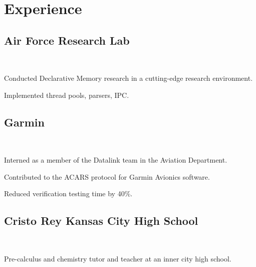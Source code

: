\documentclass[letterpaper]{deedy-resume} %
\begin{document}
\begin{minipage}[t]{0.66\textwidth}
\sectionspace %


\section{Experience}

\subsection{Air Force Research Lab}
 \hfill {} \\
\smallsectionspace
\vspace{\topsep} %
\begin{tightitemize}
\item Conducted Declarative Memory research in a cutting-edge research environment.
\item Implemented thread pools, parsers, IPC.
\end{tightitemize}

\sectionspace %


\subsection{Garmin}
 \hfill {} \\
\begin{tightitemize}
\item Interned as a member of the Datalink team in the Aviation Department. 
\item Contributed to the ACARS protocol for Garmin Avionics software.
\item Reduced verification testing time by 40\%.
\end{tightitemize}

\sectionspace %


\subsection{Cristo Rey Kansas City High School}
 \hfill {} \\
\begin{tightitemize}
\item Pre-calculus and chemistry tutor and teacher at an inner city high school. 
\end{tightitemize}


\end{minipage}
\end{document}
